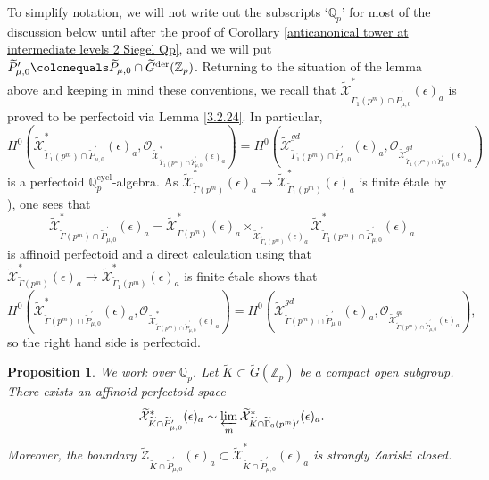 \documentclass{amsart}
\newtheorem{prop}[subsubsection]{Proposition}
\theoremstyle{remark}
\numberwithin{equation}{subsection}
\newcommand{\Q}{\QQ}
\newcommand{\Z}{\ZZ}
\newcommand{\QQ}{{\mathbb Q}}
\newcommand{\ZZ}{{\mathbb Z}}
\newcommand{\cO}{{\mathcal O}}
\newcommand{\cX}{{\mathcal X}}
\newcommand{\cZ}{{\mathcal Z}}
\newcommand{\Zp}{\Z_p}
\newcommand{\Qp}{\Q_p}
\newcommand{\cycl}{\mathrm{cycl}}
\newcommand{\tGam}{\widetilde{\Gamma}}
\newcommand{\tG}{\widetilde{G}}
\newcommand{\tK}{{\widetilde{K}}}
\newcommand{\tP}{\widetilde{P}}
\newcommand{\wt}{\widetilde}
\newcommand{\defeq}{\colonequals}
\renewcommand{\(}{\left(}
\renewcommand{\)}{\right)}
\begin{document}
To simplify notation, we will not write out the subscripts `$\Qp$' for most of the discussion below until after the proof of Corollary \ref{anticanonical tower at intermediate levels 2 Siegel Qp}, and we will put $\tP_{\mu,0}^{\prime} \defeq \tP_{\mu,0} \cap \tG^\mathrm{der}(\Zp)$. Returning to the situation of the lemma above and keeping in mind these conventions, we recall that $\wt{\cX}^{\ast}_{\tGam_{1}(p^{m}) \cap \tP_{\mu,0}^{\prime}}(\epsilon)_{a}$ is proved to be perfectoid via Lemma \ref{3.2.24}. In particular,
\[
H^{0}(\wt{\cX}^{\ast}_{\tGam_{1}(p^{m})\cap \tP_{\mu,0}^{\prime}}(\epsilon)_{a},\cO_{\wt{\cX}^{\ast}_{\tGam_{1}(p^{m})\cap \tP_{\mu,0}^{\prime}}(\epsilon)_{a}}) = H^{0}(\wt{\cX}^{gd}_{\tGam_{1}(p^{m}) \cap \tP_{\mu,0}^{\prime}}(\epsilon)_{a},\cO_{\wt{\cX}^{gd}_{\tGam_{1}(p^{m}) \cap \tP_{\mu,0}^{\prime}}(\epsilon)_{a}})
\]
is a perfectoid $\Qp^{\cycl}$-algebra. As $\wt{\cX}^{\ast}_{\tGam(p^{m})}(\epsilon)_{a} \to \wt{\cX}^{\ast}_{\tGam_{1}(p^{m})}(\epsilon)_{a}$ is finite \'etale by \cite[Lemma 3.2.35]{scholze-galois}), one sees that 
\[
\wt{\cX}^{\ast}_{\tGam(p^{m}) \cap \tP_{\mu,0}^{\prime}}(\epsilon)_{a} = \wt{\cX}^{\ast}_{\tGam(p^{m})}(\epsilon)_{a}\times_{\wt{\cX}^{\ast}_{\tGam_{1}(p^{m})}(\epsilon)_{a}} \wt{\cX}^{\ast}_{\tGam_{1}(p^{m}) \cap \tP_{\mu,0}^{\prime}}(\epsilon)_{a}
\]
is affinoid perfectoid and a direct calculation using that $\wt{\cX}^{\ast}_{\tGam(p^{m})}(\epsilon)_{a} \to \wt{\cX}^{\ast}_{\tGam_{1}(p^{m})}(\epsilon)_{a}$ is finite \'etale shows that
\[
 H^{0}(\wt{\cX}^{\ast}_{\tGam(p^{m}) \cap \tP_{\mu,0}^{\prime}}(\epsilon)_{a},\cO_{\wt{\cX}^{\ast}_{\tGam(p^{m}) \cap \tP_{\mu,0}^{\prime}}(\epsilon)_{a}}) = H^{0}(\wt{\cX}^{gd}_{\tGam(p^{m}) \cap \tP_{\mu,0}^{\prime}}(\epsilon)_{a},\cO_{\wt{\cX}^{gd}_{\tGam(p^{m}) \cap \tP_{\mu,0}^{\prime}}(\epsilon)_{a}}),
\]
so the right hand side is perfectoid.

\begin{prop}\label{anticanonical tower at intermediate levels Siegel} We work over $\Qp$. Let $\tK \subset \tG(\Z_p)$ be a compact open subgroup. There exists an affinoid perfectoid space 
\[
\wt{\cX}^{\ast}_{\tK \cap \tP_{\mu,0}^{\prime}}(\epsilon)_a \sim \varprojlim_{m} \wt{\cX}^{\ast}_{\tK \cap \tGam_{0}(p^{m})^{\prime}}(\epsilon)_a .
\]
Moreover, the boundary $\wt{\cZ}_{\tK \cap \tP_{\mu,0}^{\prime}}(\epsilon)_a \subset \wt{\cX}^{\ast}_{\tK \cap \tP_{\mu,0}^{\prime}}(\epsilon)_a$ is strongly Zariski closed. 
\end{prop}
\end{document}
